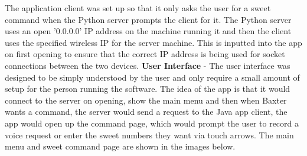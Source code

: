 \newline\newline
The application client was set up so that it only asks the user for a sweet command when the Python server prompts the client for it. The Python server uses an open '0.0.0.0' IP address on the machine running it and then the client uses the specified wireless IP for the server machine. This is inputted into the app on first opening to ensure that the correct IP address is being used for socket connections between the two devices.
\newline\newline
\textbf{User Interface} - The user interface was designed to be simply understood by the user and only require a small amount of setup for the person running the software. The idea of the app is that it would connect to the server on opening, show the main menu and then when Baxter wants a command, the server would send a request to the Java app client, the app would open up the command page, which would prompt the user to record a voice request or enter the sweet numbers they want via touch arrows. The main menu and sweet command page are shown in the images below.
